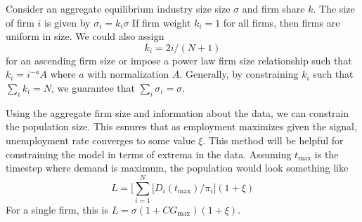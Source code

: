Consider an aggregate equilibrium industry size size $\sigma$ and firm share $k$.
The size of firm $i$ is given by $\sigma_i=k_i\sigma$
If firm weight $k_i=1$ for all firms, then firms are uniform in size. We could also assign 
\begin{equation}
    k_i=2i/(N+1)
\end{equation} for an ascending firm size or impose a power law firm size relationship such that $k_i=i^{-a}A$ where $a$ with normalization $A$. Generally, by constraining $k_i$ such that $\sum_ik_i=N$, we guarantee that $\sum_i\sigma_i=\sigma$.
 
Using the aggregate firm size and information about the data, we can constrain the population size.
This esnures that as employment maximizes given the signal, unemployment rate converges to some value $\xi$.
This method will be helpful for constraining the model in terms of extrema in the data.
Assuming $t_\textrm{max}$ is the timestep where demand is maximum, the population would look something like 
\begin{equation}
L=\Big[\sum_{i=1}^N[D_i(t_{\textrm{max}})/\pi_i\Big](1+\xi)
\end{equation}
For a single firm, this is $L=\sigma(1+CG_\textrm{max})(1+\xi)$.
